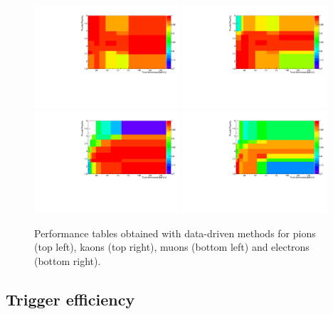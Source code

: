 \begin{figure}[h!]
\centering
\includegraphics[width=0.48\textwidth]{RKst/figs/pid_Pi.pdf}
\includegraphics[width=0.48\textwidth]{RKst/figs/pid_K.pdf}
\includegraphics[width=0.48\textwidth]{RKst/figs/pid_Mu.pdf}
\includegraphics[width=0.48\textwidth]{RKst/figs/pid_e.pdf}
\caption{Performance tables obtained with data-driven methods
for pions (top left), kaons (top right), muons (bottom left) and electrons (bottom right).}
\label{fig:pid_perf_hist}
\end{figure}


\subsection{Trigger efficiency}
\label{sec:RKst_trigger_eff}

